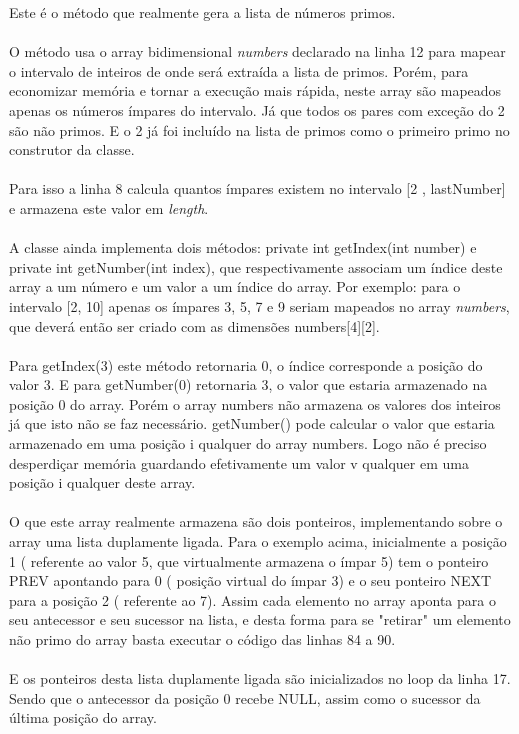 \documentclass[a4paper,12pt,openany]{book}
\begin{document}
Este é o método que realmente gera a lista de números primos.
\\
\\
O método usa o array bidimensional \textit{numbers} declarado na linha 12 para mapear o intervalo de inteiros de onde será extraída a lista de primos. Porém, para economizar memória e tornar a execução mais rápida, neste array são mapeados apenas os números ímpares do intervalo. Já que todos os pares com exceção do 2 são não primos. E o 2 já foi incluído na lista de primos como o primeiro primo no construtor da classe.
\\
\\
Para isso a linha 8 calcula quantos ímpares existem no intervalo [2 , lastNumber] e armazena este valor em \textit{length}.
\\
\\
A classe ainda implementa dois métodos: private int getIndex(int number) e private int getNumber(int index), que respectivamente associam um índice deste array a um número e um valor a um índice do array. Por exemplo: para o intervalo [2, 10] apenas os ímpares 3, 5, 7 e 9 seriam mapeados no array \textit{numbers}, que deverá então ser criado com as dimensões numbers[4][2].
\\
\\
Para getIndex(3) este método retornaria 0, o índice corresponde a posição do valor 3. E para getNumber(0) retornaria 3, o valor que estaria armazenado na posição 0 do array. Porém o array numbers não armazena os valores dos inteiros já que isto não se faz necessário. getNumber() pode calcular o valor que estaria armazenado em uma posição i qualquer do array numbers. Logo não é preciso desperdiçar memória guardando efetivamente um valor v qualquer em uma posição i qualquer deste array.
\\
\\
O que este array realmente armazena são dois ponteiros, implementando sobre o array uma lista duplamente ligada. Para o exemplo acima, inicialmente a posição 1 ( referente ao valor 5, que virtualmente armazena o ímpar 5) tem o ponteiro PREV apontando para 0 ( posição virtual do ímpar 3) e o seu ponteiro NEXT para a posição 2 ( referente ao 7). Assim cada elemento no array aponta para o seu antecessor e seu sucessor na lista, e desta forma para se "retirar" um elemento não primo do array basta executar o código das linhas 84 a 90.
\\
\\
E os ponteiros desta lista duplamente ligada são inicializados no loop da linha 17. Sendo que o antecessor da posição 0 recebe NULL, assim como o sucessor da última posição do array.
\end{document}
